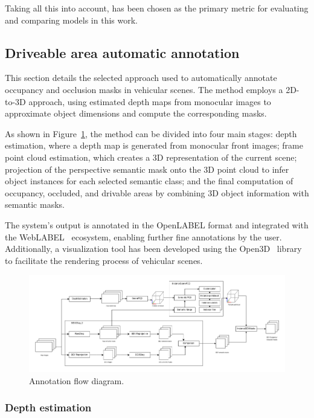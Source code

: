 Taking all this into account,  has been chosen as the primary metric for evaluating and comparing models in this work.

\subsection{Driveable area automatic annotation}
\label{sec:aplication}

This section details the selected approach used to automatically annotate occupancy and occlusion masks in vehicular scenes. The method employs a 2D-to-3D approach, using estimated depth maps from monocular images to approximate object dimensions and compute the corresponding masks.

As shown in Figure~\ref{fig:application_flow_diagram}, the method can be divided into four main stages: depth estimation, where a depth map is generated from monocular front images; frame point cloud estimation, which creates a 3D representation of the current scene; projection of the perspective semantic mask onto the 3D point cloud to infer object instances for each selected semantic class; and the final computation of occupancy, occluded, and drivable areas by combining 3D object information with  semantic masks.

The system's output is annotated in the OpenLABEL format and integrated with the WebLABEL~\cite{weblabel} ecosystem, enabling further fine annotations by the user. Additionally, a visualization tool has been developed using the Open3D~\cite{open3d} library to facilitate the rendering process of vehicular scenes.

\begin{figure}[h!]
    \centering
    \includegraphics[width=\linewidth]{images/methodology/Application_flow_diagram.png}
    \caption{Annotation flow diagram.}
    \label{fig:application_flow_diagram}
\end{figure}

\subsubsection{Depth estimation}
\label{sec:depth_estimation}

